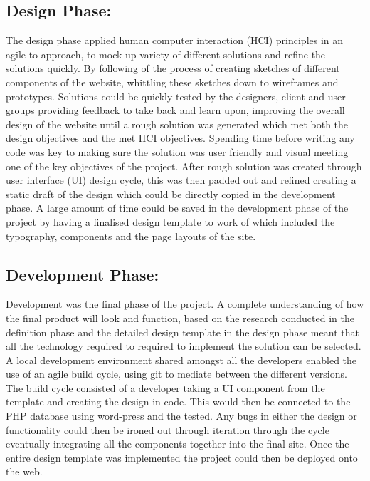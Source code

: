 \documentclass[fontsize=11pt]{extarticle}
\numberwithin{figure}{section} %
\begin{document}
\hypertarget{design-phase}{%
\subsection{Design Phase:}\label{design-phase}}

The design phase applied human computer interaction (HCI) principles in
an agile to approach, to mock up variety of different solutions and
refine the solutions quickly. By following of the process of creating
sketches of different components of the website, whittling these
sketches down to wireframes and prototypes. Solutions could be quickly
tested by the designers, client and user groups providing feedback to
take back and learn upon, improving the overall design of the website
until a rough solution was generated which met both the design
objectives and the met HCI objectives. Spending time before writing any
code was key to making sure the solution was user friendly and visual
meeting one of the key objectives of the project. After rough solution
was created through user interface (UI) design cycle, this was then
padded out and refined creating a static draft of the design which could
be directly copied in the development phase. A large amount of time
could be saved in the development phase of the project by having a
finalised design template to work of which included the typography,
components and the page layouts of the site.

\hypertarget{development-phase}{%
\subsection{Development Phase:}\label{development-phase}}

Development was the final phase of the project. A complete understanding
of how the final product will look and function, based on the research
conducted in the definition phase and the detailed design template in
the design phase meant that all the technology required to required to
implement the solution can be selected. A local development environment
shared amongst all the developers enabled the use of an agile build
cycle, using git to mediate between the different versions. The build
cycle consisted of a developer taking a UI component from the template
and creating the design in code. This would then be connected to the PHP
database using word-press and the tested. Any bugs in either the design
or functionality could then be ironed out through iteration through the
cycle eventually integrating all the components together into the final
site. Once the entire design template was implemented the project could
then be deployed onto the web.
\end{document}
